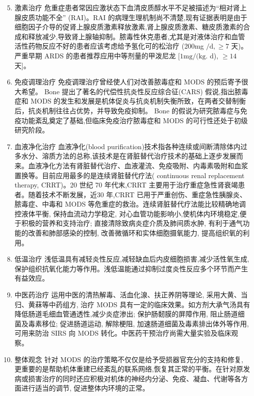 \documentclass[10pt]{article}
\begin{document}
\begin{enumerate}
  \setcounter{enumi}{4}
  \item 激素治疗 危重症患者常因应激状态下血清皮质醇水平不足被描述为“相对肾上腺皮质功能不全” (RAI)。RAI 的病理生理机制尚不清楚,现有证据表明是由于细胞因子介导的促肾上腺皮质激素释放激素,肾上腺皮质激素、糖皮质激素的合成和释放减少,导致肾上腺轴抑制。脓毒性休克患者,尤其是对液体治疗和血管活性药物反应不好的患者应该考虑给予氢化可的松治疗 (200mg $/ \mathrm{d}, \geqslant 7$ 天)。严重早期 ARDS 的患者推荐应用中等剂量的甲泼尼龙 $[1 \mathrm{mg} /(\mathrm{kg}$. d), $\geqslant 14$ 天]。

  \item 免疫调理治疗 免疫调理治疗曾经使人们对改善脓毒症和 MODS 的预后寄予很大希望。 Bone 提出了著名的代偿性抗炎性反应综合征(CARS) 假说,指出脓毒症和 MODS 的发生和发展是机体促炎与抗炎机制失衡所致，在两者交替制衡后，抗炎机制往往占优势，并导致免疫抑制。 Bone 的假说为研究脓毒症与免疫功能紊乱奠定了基础,但临床免疫治疗脓毒症和 MODS 的可行性还处于初级研究阶段。

  \item 血液净化治疗 血液净化(blood purification)技术指各种连续或间断清除体内过多水分、溶质方法的总称,该技术是在肾脏替代治疗技术的基础上逐步发展而来。血液净化方法有肾脏替代治疗、血液灌流、免疫吸附、内毒素吸附和血浆置换等。目前应用最多的是连续肾脏替代疗法( continuous renal replacement therapy, CRRT)。20 世纪 70 年代末,CRRT 主要用于治疗重症急性肾衰竭患者。随着技术不断发展，近30 年,CRRT 已用于严重创伤、重症急性胰腺炎、脓毒症、中毒和 MODS 等危重症的救治。连续肾脏替代疗法能比较精确地调控液体平衡, 保持血流动力学稳定, 对心血管功能影响小,使机体内环境稳定,便于积极的营养和支持治疗; 直接清除致病炎症介质及肺间质水肿, 有利于通气功能的改善和肺部感染的控制, 改善微循环和实体细胞摄氧能力, 提高组织氧的利用。

  \item 低温治疗 浅低温具有减轻炎性反应,减轻缺血后内皮细胞损害,减少活性氧生成,保护组织抗氧化能力等作用。浅低温能通过抑制过度炎性反应多个环节而产生有益效应。

  \item 中医药治疗 运用中医的清热解毒、活血化湶、扶正养阴等理论, 采用大黄、当归、黄菻等中药组方, 治疗 MODS 具有一定的临床效果。如方剂大承气汤具有降低肠道毛细血管通透性,减少炎症渗出; 保护肠䵑膜的屏障作用, 阻止肠道细菌及毒素移位; 促进肠道运动, 解除梗阻, 加速肠道细菌及毒素排出体外等作用, 可用来防治 SIRS 向 MODS 转化。中医药干预治疗尚需大量实验及临床观察。

  \item 整体观念 针对 MODS 的治疗策略不仅仅是给予受损器官充分的支持和修复, 更重要的是帮助机体重建已经紊乱的联系网络,恢复其正常的平衡。在针对原发病或损害治疗的同时还应积极对机体的神经内分泌、免疫、凝血、代谢等各方面进行适当的调节, 促进整体内环境的正常。

\end{enumerate}
\end{document}
